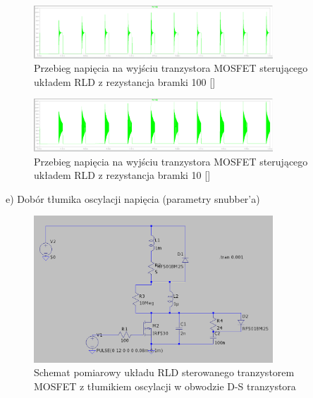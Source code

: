 \documentclass[11pt]{article}
\begin{document}
\begin{figure}[H]
\centering
\includegraphics[width=0.8\textwidth]{aun1_rld_without_snubber_rgate100ohm.png}
\caption{Przebieg napięcia na wyjściu tranzystora MOSFET sterującego układem RLD z rezystancja bramki 100 [\Omega]}
\end{figure}

\begin{figure}[H]
\centering
\includegraphics[width=0.8\textwidth]{aun1_rld_without_snubber_rgate10ohm.png}
\caption{Przebieg napięcia na wyjściu tranzystora MOSFET sterującego układem RLD z rezystancja bramki 10 [\Omega]}
\end{figure}

e) Dobór tłumika oscylacji napięcia (parametry snubber'a)

\begin{figure}[H]
\centering
\includegraphics[width=0.8\textwidth]{aun1_rld_with_snubber.png}
\caption{Schemat pomiarowy układu RLD sterowanego tranzystorem MOSFET z tłumikiem oscylacji w obwodzie D-S tranzystora}
\end{figure}
\end{document}
